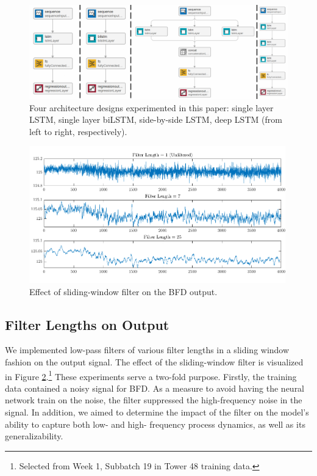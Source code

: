 \begin{figure}[t!]
    \centering
    \includegraphics[width=\textwidth]{figures/architectures.png}
    \caption{Four architecture designs experimented in this paper: single layer LSTM, single layer biLSTM, side-by-side LSTM, deep LSTM (from left to right, respectively). }
    \label{fig:nn_archs}
\end{figure}

\begin{figure}[t!]
    \centering
    \includegraphics[width=0.99\textwidth]{figures/filter.png}
    \caption{Effect of sliding-window filter on the BFD output.}
    \label{fig:filter}
\end{figure}

\subsection{Filter Lengths on Output}
We implemented low-pass filters of various filter lengths in a sliding window fashion on the output signal. The effect of the sliding-window filter is visualized in Figure \ref{fig:filter}.\footnote{Selected from Week 1, Subbatch 19 in Tower 48 training data.} These experiments serve a two-fold purpose. Firstly, the training data contained a noisy signal for BFD. As a measure to avoid having the neural network train on the noise, the filter suppressed the high-frequency noise in the signal. In addition, we aimed to determine the impact of the filter on the model's ability to capture both low- and high- frequency process dynamics, as well as its generalizability. 

